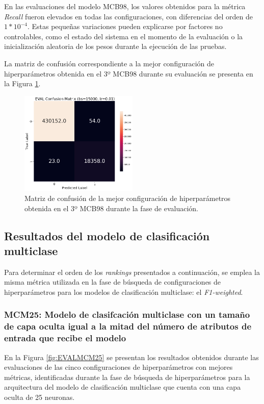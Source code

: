 En las evaluaciones del modelo MCB98, los valores obtenidos para la métrica \textit{Recall} fueron elevados en todas las configuraciones, con diferencias del orden de $1*10^{-4}$. Estas pequeñas variaciones pueden explicarse por factores no controlables, como el estado del sistema en el momento de la evaluación o la inicialización aleatoria de los pesos durante la ejecución de las pruebas.


La matriz de confusión correspondiente a la mejor configuración de hiperparámetros obtenida en el 3º MCB98 durante su evaluación se presenta en la Figura \ref{fig:MC_EVAL_MCB98}.

\begin{figure}[H]
    \centering
    \includegraphics[width=0.5\textwidth]{./img/evaluacion/matrices_confusion/MC_EVAL_MCB98.png}
    \caption{Matriz de confusión de la mejor configuración de hiperparámetros obtenida en el 3º MCB98 durante la fase de evaluación.}
    \label{fig:MC_EVAL_MCB98}
\end{figure}




\subsection{Resultados del modelo de clasificación multiclase}
Para determinar el orden de los \textit{rankings} presentados a continuación, se emplea la misma métrica utilizada en la fase de búsqueda de configuraciones de hiperparámetros para los modelos de clasificación multiclase: el \textit{F1-weighted}.

\subsubsection{MCM25: Modelo de clasifcación multiclase con un tamaño de capa oculta igual a la mitad del número de atributos de entrada que recibe el modelo}

En la Figura \ref{fig:EVALMCM25} se presentan los resultados obtenidos durante las evaluaciones de las cinco configuraciones de hiperparámetros con mejores métricas, identificadas durante la fase de búsqueda de hiperparámetros para la arquitectura del modelo de clasificación multiclase que cuenta con una capa oculta de 25 neuronas.

